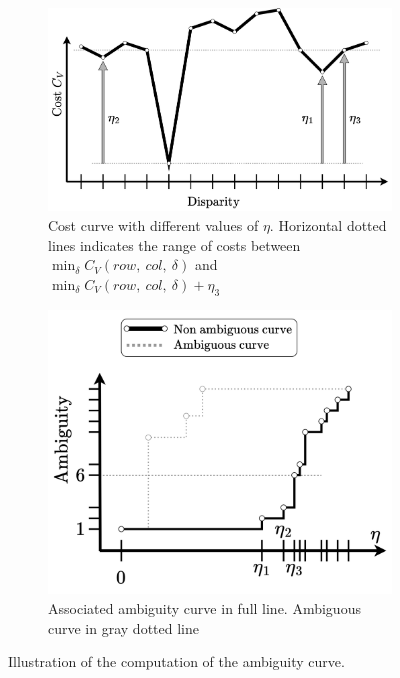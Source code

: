 \begin{figure}
    \centering
    \begin{subfigure}[t]{0.6\linewidth}
        \centering
        \includegraphics[width=\linewidth]{Images/Chap_1/Integral_Ambiguity_1.png}
        \caption{Cost curve with different values of $\eta$. Horizontal dotted lines indicates the range of costs between $\min_\delta C_V(row, ~col, ~\delta)$ and $\min_\delta C_V(row, ~col, ~\delta)+\eta_3$}
        \label{fig:integral_ambiguity_1}
    \end{subfigure}\hfill
    \begin{subfigure}[t]{0.4\linewidth}
        \centering
        \includegraphics[width=\linewidth]{Images/Chap_1/Integral_Ambiguity_2.png}
        \caption{Associated ambiguity curve in full line. Ambiguous curve in gray dotted line}
        \label{fig:integral_ambiguity_2}
    \end{subfigure}\hfill
    \caption{Illustration of the computation of the ambiguity curve.}
    \label{fig:integral_ambiguity}
\end{figure}

